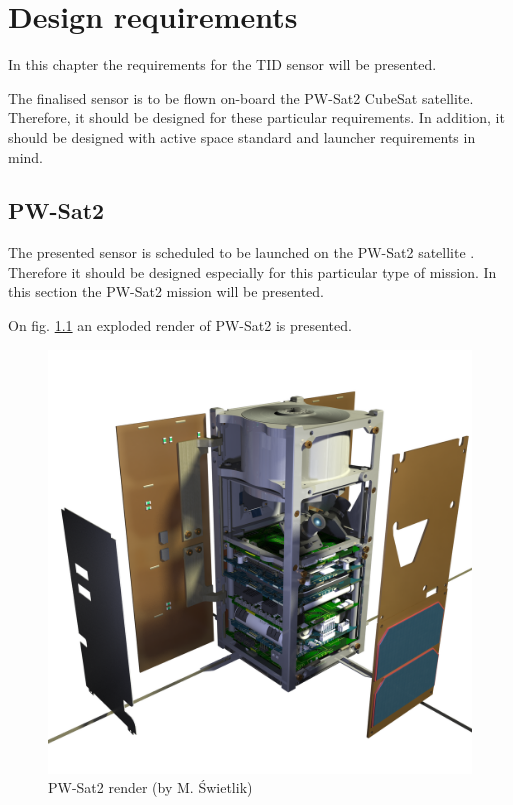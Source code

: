 \chapter{Design requirements}
\label{Design_requirements}

In this chapter the requirements for the TID sensor will be presented.

The finalised sensor is to be flown on-board the PW-Sat2 CubeSat satellite. Therefore, it should be designed for these particular requirements. In addition, it should be designed with active space standard and launcher requirements in mind.


\section{PW-Sat2}
    The presented sensor is scheduled to be launched on the PW-Sat2 satellite \cite{PW-Sat2URL}. Therefore it should be designed especially for this particular type of mission. In this section the PW-Sat2 mission will be presented.

    On fig. \ref{PW-Sat_render_01} an exploded render of PW-Sat2 is presented.

    \begin{figure}[h]
        \centering
        \includegraphics[width=0.5\paperwidth]{img/PW-Sat2_render_01.png}
        \caption{PW-Sat2 render (by M. Świetlik)}
        \label{PW-Sat_render_01}
    \end{figure}

